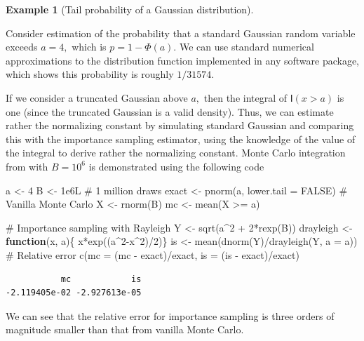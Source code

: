 \documentclass[
  11pt,
  letterpaper,
]{scrbook}
\newenvironment{Shaded}{\begin{snugshade}}{\end{snugshade}}
\newcommand{\AttributeTok}[1]{\textcolor[rgb]{0.40,0.45,0.13}{#1}}
\newcommand{\CommentTok}[1]{\textcolor[rgb]{0.37,0.37,0.37}{#1}}
\newcommand{\ConstantTok}[1]{\textcolor[rgb]{0.56,0.35,0.01}{#1}}
\newcommand{\ControlFlowTok}[1]{\textcolor[rgb]{0.00,0.23,0.31}{\textbf{#1}}}
\newcommand{\DecValTok}[1]{\textcolor[rgb]{0.68,0.00,0.00}{#1}}
\newcommand{\FloatTok}[1]{\textcolor[rgb]{0.68,0.00,0.00}{#1}}
\newcommand{\FunctionTok}[1]{\textcolor[rgb]{0.28,0.35,0.67}{#1}}
\newcommand{\NormalTok}[1]{\textcolor[rgb]{0.00,0.23,0.31}{#1}}
\newcommand{\OtherTok}[1]{\textcolor[rgb]{0.00,0.23,0.31}{#1}}
\newcommand{\SpecialCharTok}[1]{\textcolor[rgb]{0.37,0.37,0.37}{#1}}
\theoremstyle{definition}
\newtheorem{example}{Example}[chapter]
\theoremstyle{plain}
\theoremstyle{plain}
\theoremstyle{plain}
\theoremstyle{definition}
\theoremstyle{definition}
\theoremstyle{plain}
\theoremstyle{plain}
\theoremstyle{remark}
\begin{document}
\begin{example}[Tail probability of a Gaussian
distribution]\protect\hypertarget{exm-tail-probability}{}\label{exm-tail-probability}

Consider estimation of the probability that a standard Gaussian random
variable exceeds \(a=4,\) which is \(p=1-\Phi(a).\) We can use standard
numerical approximations to the distribution function implemented in any
software package, which shows this probability is roughly \(1/31574.\)

If we consider a truncated Gaussian above \(a,\) then the integral of
\(\mathsf{I}(x>a)\) is one (since the truncated Gaussian is a valid
density). Thus, we can estimate rather the normalizing constant by
simulating standard Gaussian and comparing this with the importance
sampling estimator, using the knowledge of the value of the integral to
derive rather the normalizing constant. Monte Carlo integration from
with \(B=10^6\) is demonstrated using the following code

\begin{Shaded}
\begin{Highlighting}[]
\NormalTok{a }\OtherTok{\textless{}{-}} \DecValTok{4}
\NormalTok{B }\OtherTok{\textless{}{-}} \FloatTok{1e6}\NormalTok{L }\CommentTok{\# 1 million draws}
\NormalTok{exact }\OtherTok{\textless{}{-}} \FunctionTok{pnorm}\NormalTok{(a, }\AttributeTok{lower.tail =} \ConstantTok{FALSE}\NormalTok{)}
\CommentTok{\# Vanilla Monte Carlo}
\NormalTok{X }\OtherTok{\textless{}{-}} \FunctionTok{rnorm}\NormalTok{(B)}
\NormalTok{mc }\OtherTok{\textless{}{-}} \FunctionTok{mean}\NormalTok{(X }\SpecialCharTok{\textgreater{}=}\NormalTok{ a)}

\CommentTok{\# Importance sampling with Rayleigh}
\NormalTok{Y }\OtherTok{\textless{}{-}} \FunctionTok{sqrt}\NormalTok{(a}\SpecialCharTok{\^{}}\DecValTok{2} \SpecialCharTok{+} \DecValTok{2}\SpecialCharTok{*}\FunctionTok{rexp}\NormalTok{(B))}
\NormalTok{drayleigh }\OtherTok{\textless{}{-}} \ControlFlowTok{function}\NormalTok{(x, a)\{ x}\SpecialCharTok{*}\FunctionTok{exp}\NormalTok{((a}\SpecialCharTok{\^{}}\DecValTok{2}\SpecialCharTok{{-}}\NormalTok{x}\SpecialCharTok{\^{}}\DecValTok{2}\NormalTok{)}\SpecialCharTok{/}\DecValTok{2}\NormalTok{)\}}
\NormalTok{is }\OtherTok{\textless{}{-}} \FunctionTok{mean}\NormalTok{(}\FunctionTok{dnorm}\NormalTok{(Y)}\SpecialCharTok{/}\FunctionTok{drayleigh}\NormalTok{(Y, }\AttributeTok{a =}\NormalTok{ a))}
\CommentTok{\# Relative error}
\FunctionTok{c}\NormalTok{(}\AttributeTok{mc =}\NormalTok{ (mc }\SpecialCharTok{{-}}\NormalTok{ exact)}\SpecialCharTok{/}\NormalTok{exact, }\AttributeTok{is =}\NormalTok{ (is }\SpecialCharTok{{-}}\NormalTok{ exact)}\SpecialCharTok{/}\NormalTok{exact)}
\end{Highlighting}
\end{Shaded}

\begin{verbatim}
           mc            is 
-2.119405e-02 -2.927613e-05 
\end{verbatim}

We can see that the relative error for importance sampling is three
orders of magnitude smaller than that from vanilla Monte Carlo.

\end{example}
\end{document}
